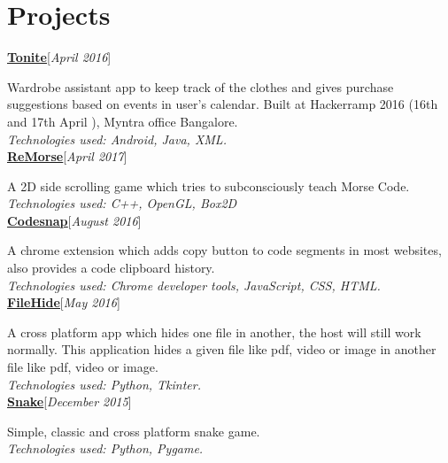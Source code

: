 \documentclass[11pt]{article}
\begin{document}
\section{Projects}

\textbf{\underline{\large\href{https://github.com/abhijith0505/Tonite}
{Tonite}}}\hfill[\textit{April 2016}]
\par
Wardrobe assistant app to keep track of the clothes and gives purchase
suggestions based on events in user's calendar.  Built at Hackerramp
2016 (16th and 17th April ), Myntra office Bangalore.\\
\textit{Technologies used:  Android, Java, XML.}
\smallskip
\\
\textbf{\underline{\large\href{https://github.com/RaghavaDhanya/ReMorse}
{ReMorse}}}\hfill[\textit{April 2017}]
\par
A 2D side scrolling game which tries to subconsciously teach Morse Code.\\
\textit{Technologies used:  C++, OpenGL, Box2D}
\smallskip
\\
\textbf{\underline{\large\href{https://github.com/RaghavaDhanya/Codesnap}
{Codesnap}}}\hfill[\textit{August 2016}]
\par
A chrome extension which adds copy button to code segments in most
websites, also provides a code clipboard history.\\
\textit{Technologies used:  Chrome developer tools, JavaScript, CSS,
HTML.  }
\smallskip
\\
\textbf{\underline{\large\href{https://github.com/RaghavaDhanya/FileHide}
{FileHide}}}\hfill[\textit{May 2016}]
\par
A cross platform app which hides one file in another, the host will
still work normally.  This application hides a given file like pdf,
video or image in another file like pdf, video or image.\\
\textit{Technologies used:  Python, Tkinter.}
\smallskip
\\
\textbf{\underline{\large\href{https://github.com/RaghavaDhanya/Snake}
{Snake}}}\hfill[\textit{December 2015}]
\par
Simple, classic and cross platform snake game.\\
\textit{Technologies used:  Python, Pygame.} 

\end{document}
